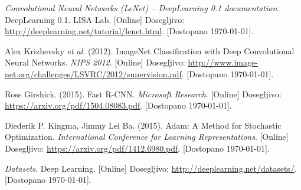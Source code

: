 \documentclass[a4paper,11pt]{article}
\begin{document}
\begin{thebibliography}{99}
 \emph{Convolutional Neural Networks (LeNet) – DeepLearning 0.1 documentation}. DeepLearning 0.1. LISA Lab.
	[Online] Dosegljivo: \url{http://deeplearning.net/tutorial/lenet.html}. [Dostopano \today].

 Alex Krizhevsky \emph{et al}. (2012). ImageNet Classification with Deep Convolutional Neural Networks.
	\emph{NIPS 2012}. [Online] Dosegljivo: \url{http://www.image-net.org/challenges/LSVRC/2012/supervision.pdf}. [Dostopano \today].

 Ross Girshick. (2015). Fast R-CNN. \emph{Microsoft Research}. [Online] Dosegljivo: \url{https://arxiv.org/pdf/1504.08083.pdf}.
	[Dostopano \today].

 Diederik P. Kingma, Jimmy Lei Ba. (2015). Adam: A Method for Stochastic Optimization.
	\emph{International Conference for Learning Representations}. [Online] Dosegljivo: \url{https://arxiv.org/pdf/1412.6980.pdf}. [Dostopano \today].

 \emph{Datasets}. Deep Learning. [Online] Dosegljivo: \url{http://deeplearning.net/datasets/}. [Dostopano \today].

\end{thebibliography}
\end{document}
